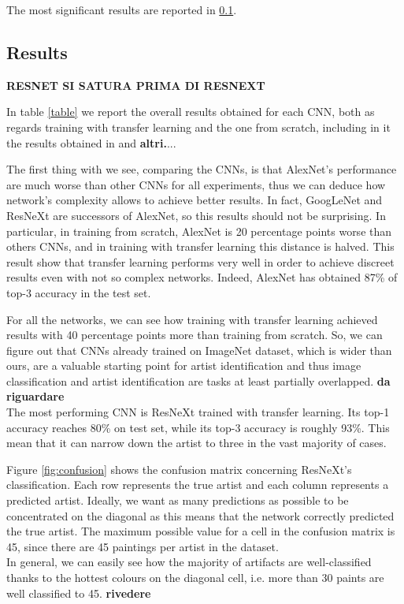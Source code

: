 \documentclass{article}
\begin{document}
The most significant results are reported in \ref{results}.

\subsection{Results}\label{results}

\textbf{RESNET SI SATURA PRIMA DI RESNEXT}

In table \ref{table} we report the overall results obtained for each CNN, both as regards training with transfer learning and the one from scratch, including in it the results obtained in \cite{ArtistIdCNN406} and \textbf{altri.}...

The first thing with we see, comparing the CNNs, is that AlexNet's performance are much worse than other CNNs for all experiments, thus we can deduce how network's complexity allows to achieve better results. In fact, GoogLeNet and ResNeXt are successors of AlexNet, so this results should not be surprising. 
In particular, in training from scratch, AlexNet is 20 percentage points worse than others CNNs, and in training with transfer learning this distance is halved. This result show that transfer learning performs very well in order to achieve discreet results even with not so complex networks. Indeed, AlexNet has obtained 87\% of top-3 accuracy in the test set.

For all the networks, we can see how training with transfer learning achieved results with 40 percentage points more than training from scratch. So, we can figure out that CNNs already trained on ImageNet dataset, which is wider than ours,  are a valuable starting point for artist identification and thus image classification and artist identification are tasks at least partially overlapped. \textbf{da riguardare}\\
The most performing CNN is ResNeXt trained with transfer learning. Its top-1 accuracy reaches 80\% on test set, while its top-3 accuracy is roughly 93\%. This mean that it can narrow down the artist to three in the vast majority of cases.

Figure \ref{fig:confusion} shows the confusion matrix concerning ResNeXt's classification. Each row represents the true artist and each column represents a predicted artist. Ideally, we want as many predictions as possible to be concentrated on the diagonal as this means that the network correctly predicted the true artist. The maximum possible value for a cell in the confusion matrix is 45, since there are 45 paintings per artist in the dataset.\\
In general, we can easily see how the majority of artifacts are well-classified thanks to the hottest colours on the diagonal cell, i.e. more than 30 paints are well classified to 45. \textbf{rivedere}
\end{document}
